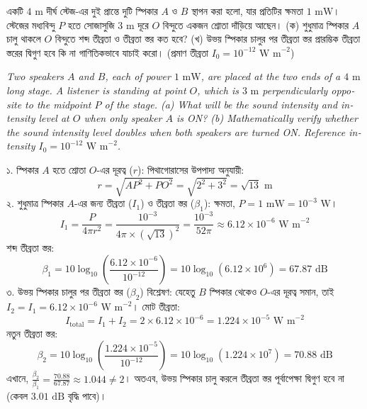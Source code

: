 \documentclass[12pt, a4paper]{article}
\begin{document}
\begin{tcolorbox}[questionbox={প্রশ্ন (Question) 10}]
\noindent
একটি $4\text{ m}$ দীর্ঘ স্টেজ-এর দুই প্রান্তে দুটি স্পিকার $A$ ও $B$ স্থাপন করা হলো, যার প্রতিটির ক্ষমতা $1\text{ mW}$। স্টেজের মধ্যবিন্দু $P$ হতে সোজাসুজি $3\text{ m}$ দূরে $O$ বিন্দুতে একজন শ্রোতা দাঁড়িয়ে আছেন। (ক) শুধুমাত্র স্পিকার $A$ চালু থাকলে $O$ বিন্দুতে শব্দ তীব্রতা ও তীব্রতা স্তর কত হবে? (খ) উভয় স্পিকার চালুর পর তীব্রতা স্তর প্রারম্ভিক তীব্রতা স্তরের দ্বিগুণ হবে কি না গাণিতিকভাবে যাচাই করো। (প্রমাণ তীব্রতা $I_0 = 10^{-12}\text{ W m}^{-2}$)

\vspace{0.8em}
\begin{english}
\noindent\textit{\color{darkgray}
Two speakers $A$ and $B$, each of power $1\text{ mW}$, are placed at the two ends of a $4\text{ m}$ long stage. A listener is standing at point $O$, which is $3\text{ m}$ perpendicularly opposite to the midpoint $P$ of the stage. (a) What will be the sound intensity and intensity level at $O$ when only speaker $A$ is ON? (b) Mathematically verify whether the sound intensity level doubles when both speakers are turned ON. Reference intensity $I_0 = 10^{-12}\text{ W m}^{-2}$.
}
\end{english}
\end{tcolorbox}

\vspace{1em}

\begin{tcolorbox}[solutionbox={সমাধান (Solution)}]
\noindent
১. স্পিকার $A$ হতে শ্রোতা $O$-এর দূরত্ব ($r$): পিথাগোরাসের উপপাদ্য অনুযায়ী:
\[ r = \sqrt{AP^2 + PO^2} = \sqrt{2^2 + 3^2} = \sqrt{13}\text{ m} \]
২. শুধুমাত্র স্পিকার $A$-এর জন্য তীব্রতা ($I_1$) ও তীব্রতা স্তর ($\beta_1$): ক্ষমতা, $P = 1\text{ mW} = 10^{-3}\text{ W}$।
\[ I_1 = \frac{P}{4\pi r^2} = \frac{10^{-3}}{4\pi \times (\sqrt{13})^2} = \frac{10^{-3}}{52\pi} \approx 6.12 \times 10^{-6}\text{ W m}^{-2} \]
শব্দ তীব্রতা স্তর:
\[ \beta_1 = 10 \log_{10} \left(\frac{6.12 \times 10^{-6}}{10^{-12}}\right) = 10 \log_{10}(6.12 \times 10^6) = 67.87\text{ dB} \]
৩. উভয় স্পিকার চালুর পর তীব্রতা স্তর ($\beta_2$) বিশ্লেষণ: যেহেতু $B$ স্পিকার থেকেও $O$-এর দূরত্ব সমান, তাই $I_2 = I_1 = 6.12 \times 10^{-6}\text{ W m}^{-2}$। মোট তীব্রতা:
\[ I_{\text{total}} = I_1 + I_2 = 2 \times 6.12 \times 10^{-6} = 1.224 \times 10^{-5}\text{ W m}^{-2} \]
নতুন তীব্রতা স্তর:
\[ \beta_2 = 10 \log_{10} \left(\frac{1.224 \times 10^{-5}}{10^{-12}}\right) = 10 \log_{10}(1.224 \times 10^7) = 70.88\text{ dB} \]
এখানে, $\frac{\beta_2}{\beta_1} = \frac{70.88}{67.87} \approx 1.044 \neq 2$। অতএব, উভয় স্পিকার চালু করলে তীব্রতা স্তর পূর্বাপেক্ষা দ্বিগুণ হবে না (কেবল $3.01\text{ dB}$ বৃদ্ধি পাবে)।
\end{tcolorbox}
\end{document}
